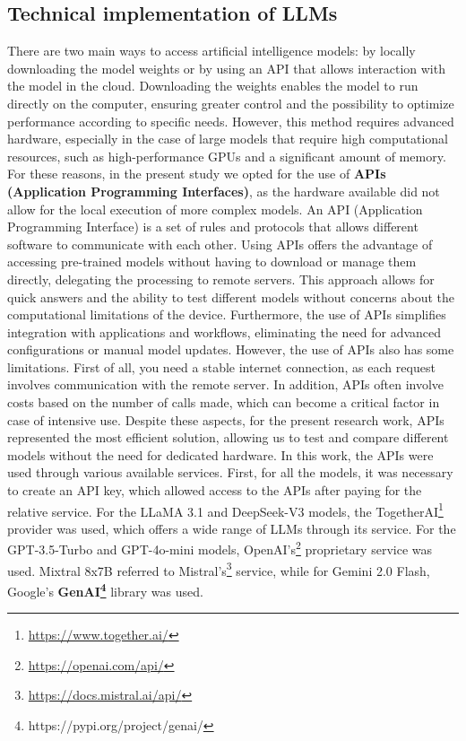 \subsection{Technical implementation of LLMs}
There are two main ways to access artificial intelligence models: by locally downloading the model weights or by using an API that allows interaction with the model in the cloud. Downloading the weights enables the model to run directly on the computer, ensuring greater control and the possibility to optimize performance according to specific needs. However, this method requires advanced hardware, especially in the case of large models that require high computational resources, such as high-performance GPUs and a significant amount of memory.
For these reasons, in the present study we opted for the use of \textbf{APIs (Application Programming Interfaces)}, as the hardware available did not allow for the local execution of more complex models. An API (Application Programming Interface) is a set of rules and protocols that allows different software to communicate with each other. Using APIs offers the advantage of accessing pre-trained models without having to download or manage them directly, delegating the processing to remote servers. This approach allows for quick answers and the ability to test different models without concerns about the computational limitations of the device. Furthermore, the use of APIs simplifies integration with applications and workflows, eliminating the need for advanced configurations or manual model updates.
However, the use of APIs also has some limitations. First of all, you need a stable internet connection, as each request involves communication with the remote server. In addition, APIs often involve costs based on the number of calls made, which can become a critical factor in case of intensive use. Despite these aspects, for the present research work, APIs represented the most efficient solution, allowing us to test and compare different models without the need for dedicated hardware.
In this work, the APIs were used through various available services. First, for all the models, it was necessary to create an API key, which allowed access to the APIs after paying for the relative service.
For the LLaMA 3.1 and DeepSeek-V3 models, the TogetherAI\footnote{\url{https://www.together.ai/}} provider was used, which offers a wide range of LLMs through its service.
For the GPT-3.5-Turbo and GPT-4o-mini models, OpenAI's\footnote{\url{https://openai.com/api/}} proprietary service was used.
Mixtral 8x7B referred to Mistral's\footnote{\url{https://docs.mistral.ai/api/}} service,  while for Gemini 2.0 Flash, Google's \textbf{GenAI\footnote{https://pypi.org/project/genai/}} library was used.


